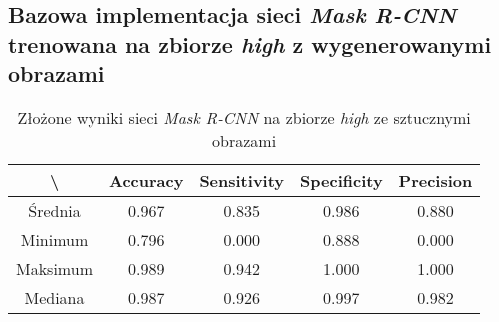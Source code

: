 \subsection{Bazowa implementacja sieci \textit{Mask R-CNN} trenowana na zbiorze \textit{high} z wygenerowanymi obrazami}

\begin{table}[H]
	\centering
	\caption{Złożone wyniki sieci \textit{Mask R-CNN} na zbiorze \textit{high} ze sztucznymi obrazami}
	\vspace{6pt}
	{\footnotesize
		\begin{tabular}{|c|c|c|c|c|}
      \hline \textbackslash & Accuracy & Sensitivity & Specificity & Precision \\
      \hline Średnia & 0.967 & 0.835 & 0.986 & 0.880 \\
      \hline Minimum & 0.796 & 0.000 & 0.888 & 0.000 \\
      \hline Maksimum & 0.989 & 0.942 & 1.000 & 1.000 \\
      \hline Mediana & 0.987 & 0.926 & 0.997 & 0.982 \\
      \hline
		\end{tabular}
	}
  \vspace{0pt}
  \label{Tab:high_original_generated_calculated}
\end{table}


